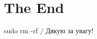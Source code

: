 \documentclass[ucs,compress]{beamer}    %
\begin{document}
\section{The End} 
\begin{frame}%
\begin{block}{sudo rm -rf / }
Дякую за увагу!
\end{block}
\end{frame}

\end{document}
